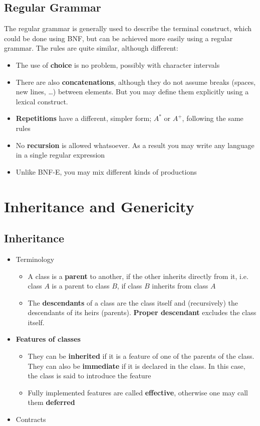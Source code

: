 \documentclass[a4paper]{article}
\begin{document}
\subsection{Regular Grammar}
The regular grammar is generally used to describe the terminal construct, which could be done using BNF, but can be achieved more easily using a regular grammar. The rules are quite similar, although different:
\begin{itemize}
\item The use of \textbf{choice} is no problem, possibly with character intervals
\item There are also \textbf{concatenations}, although they do not assume breaks (spaces, new lines, \dots) between elements. But you may define them explicitly using a lexical construct.
\item \textbf{Repetitions} have a different, simpler form; $A^*$ or $A^+$, following the same rules
\item No \textbf{recursion} is allowed whatsoever. As a result you may write any language in a single regular expression
\item Unlike BNF-E, you may mix different kinds of productions 
\end{itemize}

\section{Inheritance and Genericity}
\subsection{Inheritance}
\begin{itemize}
\item Terminology
\begin{itemize}
\item A class is a \textbf{parent} to another, if the other inherits directly from it, i.e. class $A$ is a parent to class $B$, if class $B$ inherits from class $A$
\item The \textbf{descendants} of a class are the class itself and (recursively) the descendants of its heirs (parents). \textbf{Proper descendant} excludes the class itself.
\end{itemize}
\item \textbf{Features of classes}
\begin{itemize}
\item They can be \textbf{inherited} if it is a feature of one of the parents of the class. They can also be \textbf{immediate} if it is declared in the class. In this case, the class is said to introduce the feature
\item Fully implemented features are called \textbf{effective}, otherwise one may call them \textbf{deferred}
\end{itemize}
\item Contracts 
\end{itemize}
\end{document}
